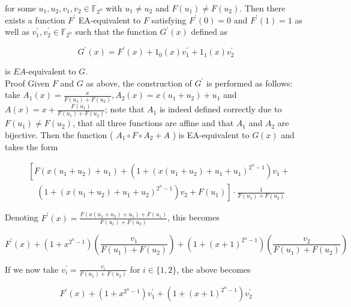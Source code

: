 \documentclass[10pt]{article}
\begin{document}
for some $u_{1}, u_{2}, v_{1}, v_{2} \in \mathbb{F}_{2^{n}}$ with $u_{1} \neq u_{2}$ and $F\left(u_{1}\right) \neq F\left(u_{2}\right)$. Then there exists a function $F^{\prime}$ EA-equivalent to $F$ satisfying $F^{\prime}(0)=0$ and $F^{\prime}(1)=1$ as well as $v_{1}^{\prime}, v_{2}^{\prime} \in \mathbb{F}_{2^{n}}$ such that the function $G^{\prime}(x)$ defined as


\begin{equation*}
G^{\prime}(x)=F^{\prime}(x)+1_{0}(x) v_{1}^{\prime}+1_{1}(x) v_{2}^{\prime} \tag{7}
\end{equation*}


is $E A$-equivalent to $G$.\\
Proof Given $F$ and $G$ as above, the construction of $G^{\prime}$ is performed as follows: take $A_{1}(x)=\frac{x}{F\left(u_{1}\right)+F\left(u_{2}\right)}, A_{2}(x)=x\left(u_{1}+u_{2}\right)+u_{1}$ and $A(x)=x+\frac{F\left(u_{1}\right)}{F\left(u_{1}\right)+F\left(u_{2}\right)}$; note that $A_{1}$ is indeed defined correctly due to $F\left(u_{1}\right) \neq F\left(u_{2}\right)$, that all three functions are affine and that $A_{1}$ and $A_{2}$ are bijective. Then the function ( $A_{1} \circ F \circ A_{2}+A$ ) is EA-equivalent to $G(x)$ and takes the form


\begin{align*}
& {\left[F\left(x\left(u_{1}+u_{2}\right)+u_{1}\right)+\left(1+\left(x\left(u_{1}+u_{2}\right)+u_{1}+u_{1}\right)^{2^{n}-1}\right) v_{1}+\right.} \\
& \left.\quad\left(1+\left(x\left(u_{1}+u_{2}\right)+u_{1}+u_{2}\right)^{2^{n}-1}\right) v_{2}+F\left(u_{1}\right)\right] \cdot \frac{1}{F\left(u_{1}\right)+F\left(u_{2}\right)} \tag{8}
\end{align*}


Denoting $F^{\prime}(x)=\frac{F\left(x\left(u_{1}+u_{2}\right)+u_{1}\right)+F\left(u_{1}\right)}{F\left(u_{1}\right)+F\left(u_{2}\right)}$, this becomes


\begin{equation*}
F^{\prime}(x)+\left(1+x^{2^{n}-1}\right)\left(\frac{v_{1}}{F\left(u_{1}\right)+F\left(u_{2}\right)}\right)+\left(1+(x+1)^{2^{n}-1}\right)\left(\frac{v_{2}}{F\left(u_{1}\right)+F\left(u_{2}\right)}\right) \tag{9}
\end{equation*}


If we now take $v_{i}^{\prime}=\frac{v_{i}}{F\left(u_{1}\right)+F\left(u_{2}\right)}$ for $i \in\{1,2\}$, the above becomes


\begin{equation*}
F^{\prime}(x)+\left(1+x^{2^{n}-1}\right) v_{1}^{\prime}+\left(1+(x+1)^{2^{n}-1}\right) v_{2}^{\prime} \tag{10}
\end{equation*}
\end{document}
